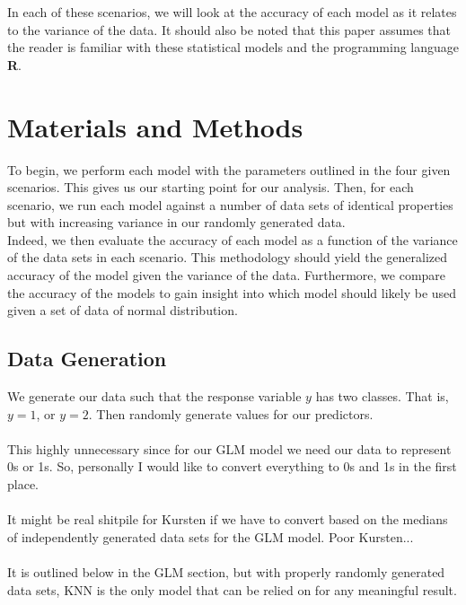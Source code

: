 \documentclass[11pt, oneside]{article}
\begin{document}
In each of these scenarios, we will look at the accuracy of each model as it relates to the variance of the data. It should also be noted that this paper assumes that the reader is familiar with these statistical models and the programming language \textbf\textsf{R}.

\pagebreak




\section*{Materials and Methods}
To begin, we perform each model with the parameters outlined in the four given scenarios. This gives us our starting point for our analysis. Then, for each scenario, we run each model against a number of data sets of identical properties but with increasing variance in our randomly generated data.\\
Indeed, we then evaluate the accuracy of each model as a function of the variance of the data sets in each scenario. This methodology should yield the generalized accuracy of the model given the variance of the data.
Furthermore, we compare the accuracy of the models to gain insight into which model should likely be used given a set of data of normal distribution.
 

\subsection*{Data Generation} 
We generate our data such that the response variable $y$ has two classes. That is, $y=1$, or $y=2$. Then randomly generate values for our predictors.\\
\\
This highly unnecessary since for our GLM model we need our data to represent 0s or 1s. So, personally I would like to convert everything to 0s and 1s in the first place.\\
\\
It might be real shitpile for Kursten if we have to convert based on the medians of independently generated data sets for the GLM model. Poor Kursten...\\
\\
It is outlined below in the GLM section, but with properly randomly generated data sets, KNN is the only model that can be relied on for any meaningful result.\\
\\
\end{document}
